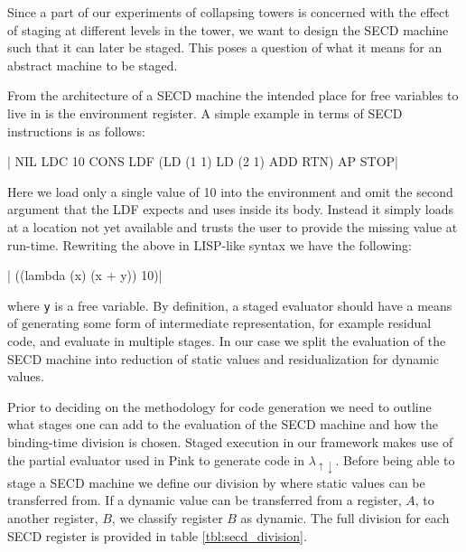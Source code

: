 \documentclass[a4paper,12pt,twoside,openright]{report}
\theoremstyle{definition}
\newcommand{\mslang}{$\lambda_{\uparrow\downarrow}$}
\begin{document}
Since a part of our experiments of collapsing towers is concerned with the effect of staging at different levels in the tower, we want to design the SECD machine such that it can later be staged. This poses a question of what it means for an abstract machine to be staged.

From the architecture of a SECD machine the intended place for free variables to live in is the environment register. A simple example in terms of SECD instructions is as follows:

|   NIL LDC 10 CONS LDF (LD (1 1) LD (2 1) ADD RTN) AP STOP|

Here we load only a single value of 10 into the environment and omit the second argument that the LDF expects and uses inside its body. Instead it simply loads at a location not yet available and trusts the user to provide the missing value at run-time. Rewriting the above in LISP-like syntax we have the following:

|    ((lambda (x) (x + y)) 10)|

where \texttt{y} is a free variable. By definition, a staged evaluator should have a means of generating some form of intermediate representation, for example residual code, and evaluate in multiple stages. In our case we split the evaluation of the SECD machine into reduction of static values and residualization for dynamic values.

Prior to deciding on the methodology for code generation we need to outline what stages one can add to the evaluation of the SECD machine and how the binding-time division is chosen. Staged execution in our framework makes use of the partial evaluator used in Pink \cite{amin2017collapsing} to generate code in \mslang. Before being able to stage a SECD machine we define our division by where static values can be transferred from. If a dynamic value can be transferred from a register, $A$, to another register, $B$, we classify register $B$ as dynamic. The full division for each SECD register is provided in table \ref{tbl:secd_division}.
\end{document}
